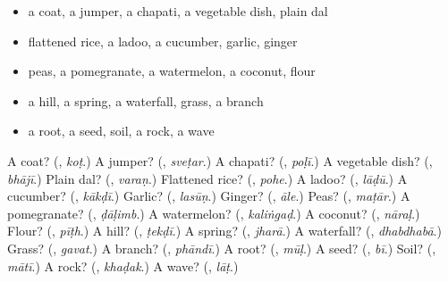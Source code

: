 \begin{itemize}
\raggedright
  \item a coat, a jumper, a chapati, a vegetable dish, plain dal
  \item flattened rice, a ladoo, a cucumber, garlic, ginger
  \item peas, a pomegranate, a watermelon, a coconut, flour
  \item a hill, a spring, a waterfall, grass, a branch
  \item a root, a seed, soil, a rock, a wave
\end{itemize}

\begin{tcolorbox}[breakable,colback=teal!4,colframe=teal!35!black,title={Before you move on}]
A coat? (\textbf{}, \emph{koṭ}.) A jumper? (\textbf{}, \emph{sveṭar}.) A chapati? (\textbf{}, \emph{poḷī}.) A vegetable dish? (\textbf{}, \emph{bhājī}.) Plain dal? (\textbf{}, \emph{varaṇ}.) Flattened rice? (\textbf{}, \emph{pohe}.) A ladoo? (\textbf{}, \emph{lāḍū}.) A cucumber? (\textbf{}, \emph{kākḍī}.) Garlic? (\textbf{}, \emph{lasūṇ}.) Ginger? (\textbf{}, \emph{āle}.) Peas? (\textbf{}, \emph{maṭār}.) A pomegranate? (\textbf{}, \emph{ḍāḷimb}.) A watermelon? (\textbf{}, \emph{kaliṅgaḍ}.) A coconut? (\textbf{}, \emph{nāraḷ}.) Flour? (\textbf{}, \emph{pīṭh}.) A hill? (\textbf{}, \emph{ṭekḍī}.) A spring? (\textbf{}, \emph{jharā}.) A waterfall? (\textbf{}, \emph{dhabdhabā}.) Grass? (\textbf{}, \emph{gavat}.) A branch? (\textbf{}, \emph{phāndī}.) A root? (\textbf{}, \emph{mūḷ}.) A seed? (\textbf{}, \emph{bī}.) Soil? (\textbf{}, \emph{mātī}.) A rock? (\textbf{}, \emph{khaḍak}.) A wave? (\textbf{}, \emph{lāṭ}.)
\end{tcolorbox}
